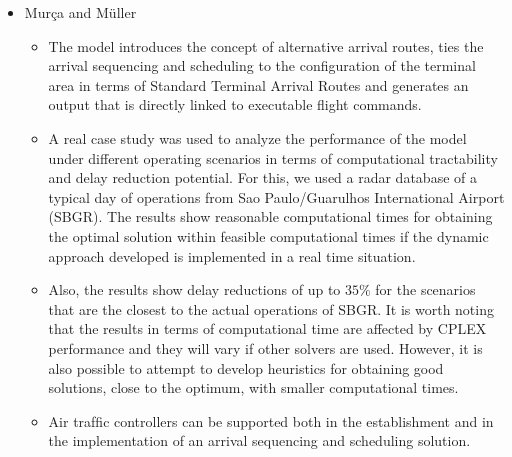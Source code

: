 \documentclass{aer1315-pretty}
\begin{document}
\begin{itemize}
\item Mur\c{c}a and M{\"u}ller \cite{Murca:2015}

\begin{itemize}
\item The model introduces the concept of alternative arrival routes, ties the arrival sequencing and scheduling to the conﬁguration of the terminal area in terms of Standard Terminal Arrival Routes and generates an output that is directly linked to executable ﬂight commands. 
\item    A real case study was used to analyze the performance of the model under different operating scenarios in terms of computational tractability and delay reduction potential. For this, we used a radar database of a typical day of operations from Sao Paulo/Guarulhos International Airport (SBGR). The results show reasonable computational times for obtaining the optimal solution within feasible computational times if the dynamic approach developed is implemented in a real time situation.
\item  Also, the results show delay reductions of up to $35\%$ for the scenarios that are the closest to the actual operations of SBGR. It is worth noting that the results in terms of computational time are affected by CPLEX performance and they will vary if other solvers are used. However, it is also possible to attempt to develop heuristics for obtaining good solutions, close to the optimum, with smaller computational times.
\item Air trafﬁc controllers can be supported both in the establishment and in the implementation of an arrival sequencing and scheduling solution.
\end{itemize}



\end{itemize}
\end{document}
